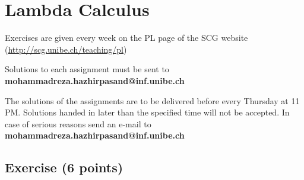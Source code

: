 \documentclass [11pt, a4wide, twoside]{article}
\begin{document}
\section*{\space{} Lambda Calculus}


\begin{myitemize}
\item Exercises are given every week on the PL page of the SCG website \\ (\url{http://scg.unibe.ch/teaching/pl})
\item Solutions to each assignment must be sent to \textbf{mohammadreza.hazhirpasand@inf.unibe.ch}
\item The solutions of the assignments are to be delivered before every Thursday at 11 PM. Solutions handed in later than the specified time will not be accepted. In case of serious reasons send an e-mail to  \textbf{mohammadreza.hazhirpasand@inf.unibe.ch}
\end{myitemize}


\subsection*{Exercise (6 points)}
\end{document}

